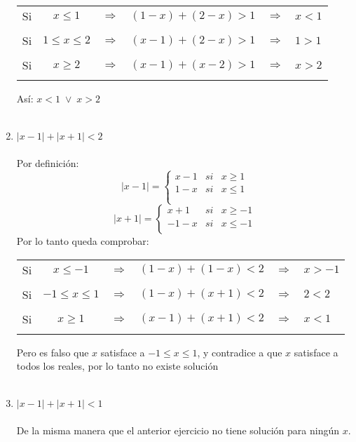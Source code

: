 \begin{ej}
\begin{enumerate}[\bfseries (i)]
\begin{center}
\begin{tabular}{c c c r c l}
Si&$x\leq 1$&$\Rightarrow$&$(1-x)+(2-x)>1$&$\Rightarrow$&$x<1$\\\\
Si&$1\leq x\leq 2$&$\Rightarrow$&$(x-1)+(2-x)>1$&$\Rightarrow$&$1>1$\\\\
Si&$x\geq 2$&$\Rightarrow$&$(x-1)+(x-2)>1$&$\Rightarrow$&$x>2$\\\\
\end{tabular}
\end{center}
Así: $x<1 \; \lor \; x>2$\\\\

\item $|x-1|+|x+1|<2$\\\\
Por definición:
\begin{equation}
|x-1| = \left\lbrace
\begin{array}{rcr}
  x-1& si & x\geq 1\\
 1-x& si & x \leq 1\\\\
\end{array}
\right.
\end{equation}
\begin{equation}
|x+1| = \left\lbrace
\begin{array}{rcr}
  x+1& si & x\geq -1\\
 -1-x& si & x \leq -1\\
\end{array}
\right.
\end{equation}
Por lo tanto queda comprobar:\\
\begin{center}
\begin{tabular}{c c c r c l}
Si&$x\leq -1$&$\Rightarrow$&$(1-x)+(1-x)<2$&$\Rightarrow$&$x>-1$\\\\
Si&$-1\leq x \leq 1$&$\Rightarrow$&$(1-x)+(x+1)<2$&$\Rightarrow$&$2<2$\\\\
Si&$x\geq 1$&$\Rightarrow$&$(x-1)+(x+1)<2$&$\Rightarrow$&$x<1$\\\\
\end{tabular}
\end{center}
Pero es falso que $x$ satisface a $-1\leq x \leq 1$, y contradice a que $x$ satisface a todos los reales, por lo tanto no existe solución\\\\ 
\item $|x-1|+|x+1|<1$ \\\\ De la misma manera que el anterior ejercicio no tiene solución para ningún $x$.\\\\


\end{enumerate}
\end{ej}
